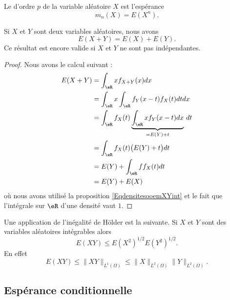 Le  d'ordre \( p\) de la variable aléatoire \( X\) est l'espérance
\begin{equation}
    m_n(X)=E(X^n).
\end{equation}

\begin{proposition}
    Si \( X\) et \( Y\) sont deux variables aléatoires, nous avons
    \begin{equation}
        E(X+Y)=E(X)+E(Y).
    \end{equation}
    Ce résultat est encore valide si \( X\) et \( Y\) ne sont pas indépendantes.
\end{proposition}

\begin{proof}
    Nous avons le calcul suivant :
    \begin{subequations}
        \begin{align}
            E(X+Y)&=\int_{\eR}xf_{X+Y}(x)dx\\
            &=\int_{\eR}x\int_{\eR}f_Y(x-t)f_X(t)dtdx\\
            &=\int_{\eR}f_X(t)\underbrace{\int_{\eR}xf_Y(x-t)dx}_{=E(Y)+t}\,dt\\
            &=\int_{\eR}f_X(t)\big( E(Y)+t \big)dt\\
            &=E(Y)+\int_{\eR}ff_X(t)dt\\
            &=E(Y)+E(X)
        \end{align}
    \end{subequations}
    où nous avons utilisé la proposition \ref{EqdensitesooemXYint} et le fait que l'intégrale sur \( \eR\) d'une densité vaut \( 1\).
\end{proof}

Une application de l'inégalité de Hölder est la suivante. Si \( X\) et \( Y\) sont des variables aléatoires intégrables alors
\begin{equation}
    E(XY)\leq E(X^2)^{1/2}E(Y^2)^{1/2}.
\end{equation}
En effet
\begin{equation}    \label{EqEXYleqXdYdNormHolder}
    E(XY)\leq \| XY \|_{L^1(\Omega)}\leq \| X \|_{L^2(\Omega)}\| Y \|_{L^2(\Omega)}.
\end{equation}

\subsection{Espérance conditionnelle}


